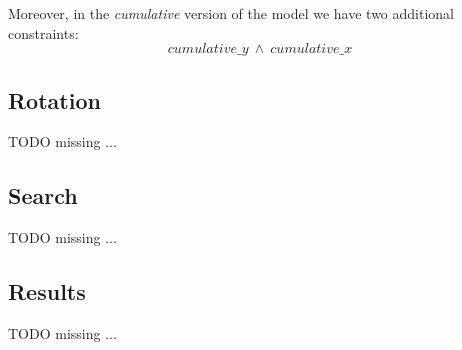     Moreover, in the \textit{cumulative} version of the model we have two additional constraints:
    \[
      cumulative\_y\ \land\ cumulative\_x
    \]




\subsection{Rotation}
    \colorbox{BurntOrange}{TODO missing ...} \\


\subsection{Search}
    \colorbox{BurntOrange}{TODO missing ...} \\


\subsection{Results}
    \colorbox{BurntOrange}{TODO missing ...} \\
